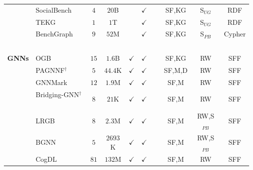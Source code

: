 \begin{landscape}
\begin{table}[htbp]
{\begin{tabular}{ll|cccccccc}
                { ~              }  & { SocialBench~\cite{Erling2015}           }      &  $4$      & $20$B        &               & $\checkmark$  &               & SF,KG         & S$_{UG}$      &  RDF          \\
                { ~              }  & { TEKG~\cite{Mcnight2021}           }            &  $1$      & $1$T         &               & $\checkmark$  &               & SF,KG         & S$_{UG}$      &  RDF          \\
                { ~              }  & { BenchGraph~\cite{Javor2022,Javor2023}   }      &  $9$      & $52$M        &               & $\checkmark$  &               & SF,KG         & S$_{PB}$      &  Cypher       \\
                { ~              }  & { ~                                       }      &   ~       &       ~      &       ~       &       ~       &       ~       &       ~       &       ~       &      ~        \\
                { \textbf{GNNs}  }  & { OGB~\cite{Hu2020}                       }      &  $15$     &  $1.6$B      & $\checkmark$  & $\checkmark$  &               & SF,KG         & RW             & SFF           \\
                { ~              }  & { PAGNNF${^\dagger}$~\cite{Wu2021a}          }   &  $5$      &  $44.4$K     & $\checkmark$  & $\checkmark$  &               & SF,M,D      & RW             & SFF           \\
                { ~              }  & { GNNMark~\cite{Baruah2021}               }      &  $12$     &  $1.9$M      & $\checkmark$  & $\checkmark$  &               & SF,M          & RW             & SFF           \\
                { ~              }  & { Bridging-GNN$^{\dagger}$~\cite{Huang2021}  }   &  $8$      &  $21$K       & $\checkmark$  & $\checkmark$  &               & SF,M          & RW             & SFF           \\
                { ~              }  & { LRGB~\cite{Dwivedi2022}                 }      &  $8$      &  $2.3$M      & $\checkmark$  & $\checkmark$  &               & SF,M          & RW,S$_{PB}$    & SFF           \\
                { ~              }  & { BGNN~\cite{Dwivedi2023}                 }      &  $5$      &  $2693$K     & $\checkmark$  & $\checkmark$  &               & SF,M          & RW,S$_{PB}$    & SFF           \\
                { ~              }  & { CogDL~\cite{Cen2023}                    }      &  $81$     &  $132$M      & $\checkmark$  & $\checkmark$  &               & SF,M          & RW             & SFF           \\

\end{tabular}}
\end{table}
\end{landscape}
